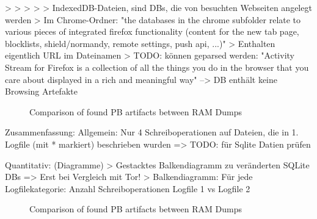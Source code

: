 		> %
		> %
		> %
		> %
			> IndexedDB-Dateien, sind DBs, die von besuchten Webseiten
			angelegt werden %
			> Im Chrome-Ordner: "the databases in the chrome subfolder relate to various pieces of integrated firefox functionality (content for the new tab page, blocklists, shield/normandy, remote settings, push api, ...)"
			> Enthalten eigentlich URL im Dateinamen
			> TODO: können geparsed werden: %
			"Activity Stream for Firefox is a collection of all the things you do in the browser that you care about displayed in a rich and meaningful way" 
			--> DB enthält keine Browsing Artefakte
	\begin{figure}[h!]
		\centerline{}
		\label{chart:final-criteria}  
		\caption{Comparison of found PB artifacts between RAM Dumps}
	\end{figure}


Zusammenfassung:
	Allgemein: Nur 4 Schreiboperationen auf Dateien, die in 1. Logfile (mit * markiert) beschrieben wurden => TODO: für Sqlite Datien prüfen

Quantitativ: (Diagramme)		
	> Gestacktes Balkendiagramm zu veränderten SQLite DBs => Erst bei Vergleich mit Tor!
	> Balkendiagramm: Für jede Logfilekategorie: Anzahl Schreiboperationen Logfile 1 vs Logfile 2
	\begin{figure}[h!]
		\centerline{}
		\label{chart:final-criteria}  
		\caption{Comparison of found PB artifacts between RAM Dumps}
	\end{figure}

